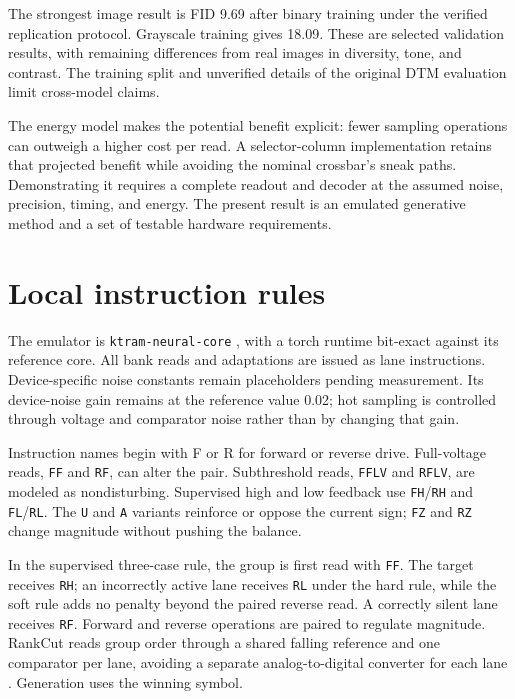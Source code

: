 \documentclass[reprint,amsmath,amssymb,aps,pra,floatfix,nofootinbib]{revtex4-2}
\begin{document}
The strongest image result is FID 9.69 after binary training under the verified replication protocol. Grayscale training gives 18.09. These are selected validation results, with remaining differences from real images in diversity, tone, and contrast. The training split and unverified details of the original DTM evaluation limit cross-model claims.

The energy model makes the potential benefit explicit: fewer sampling operations can outweigh a higher cost per read. A selector-column implementation retains that projected benefit while avoiding the nominal crossbar's sneak paths. Demonstrating it requires a complete readout and decoder at the assumed noise, precision, timing, and energy. The present result is an emulated generative method and a set of testable hardware requirements.

\appendix
\section{Local instruction rules}\label{app:instructions}
The emulator is \texttt{ktram-neural-core} \cite{knowm2026emulator}, with a torch runtime bit-exact against its reference core. All bank reads and adaptations are issued as lane instructions. Device-specific noise constants remain placeholders pending measurement. Its device-noise gain remains at the reference value 0.02; hot sampling is controlled through voltage and comparator noise rather than by changing that gain.

Instruction names begin with F or R for forward or reverse drive. Full-voltage reads, \texttt{FF} and \texttt{RF}, can alter the pair. Subthreshold reads, \texttt{FFLV} and \texttt{RFLV}, are modeled as nondisturbing. Supervised high and low feedback use \texttt{FH}/\texttt{RH} and \texttt{FL}/\texttt{RL}. The \texttt{U} and \texttt{A} variants reinforce or oppose the current sign; \texttt{FZ} and \texttt{RZ} change magnitude without pushing the balance.

In the supervised three-case rule, the group is first read with \texttt{FF}. The target receives \texttt{RH}; an incorrectly active lane receives \texttt{RL} under the hard rule, while the soft rule adds no penalty beyond the paired reverse read. A correctly silent lane receives \texttt{RF}. Forward and reverse operations are paired to regulate magnitude. RankCut reads group order through a shared falling reference and one comparator per lane, avoiding a separate analog-to-digital converter for each lane \cite{knowm2026blog}. Generation uses the winning symbol.
\end{document}
